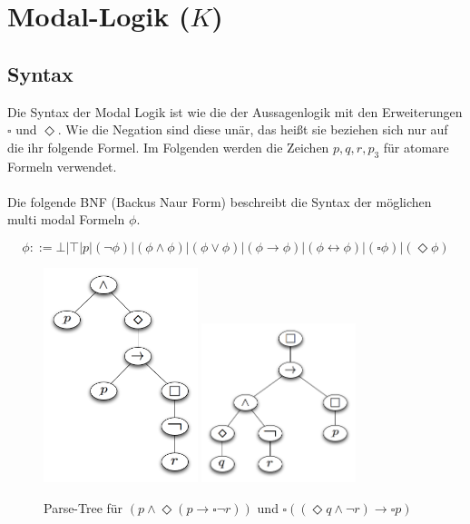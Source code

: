 

\section{Modal-Logik ($K$)} %
\label{sec:modal_logic}

\subsection{Syntax} %
\label{sec:syntax}
Die Syntax der Modal Logik ist wie die der Aussagenlogik mit den Erweiterungen $\square$ und $\Diamond$. 
Wie die Negation sind diese unär, das heißt sie beziehen sich nur auf die ihr folgende Formel. Im Folgenden werden die Zeichen $p, q, r, p_3$ für atomare Formeln verwendet.\cite[S.307f]{huth2004logic}\\
\\
Die folgende BNF (Backus Naur Form) beschreibt die Syntax der möglichen multi modal Formeln $\phi$.

\begin{equation}
	\phi ::= \bot|\top|p|(\neg\phi)|(\phi\wedge\phi)|(\phi\vee\phi)|(\phi\rightarrow\phi)|
	(\phi\leftrightarrow\phi)|(\square\phi)|(\Diamond\phi)
\end{equation}

\begin{figure}[ht]
	\begin{center}
  	\includegraphics[width=0.4\textwidth]{./Images/mmFormel01.png}
		\includegraphics[width=0.4\textwidth]{./Images/mmFormel02.png}
  	\caption{Parse-Tree für $(p \wedge \Diamond(p \rightarrow \square \neg r))$ und 
		$\square((\Diamond q \wedge \neg r) \rightarrow \square p )$}
		\label{fig:mmFormel01}
	\end{center}
\end{figure}


